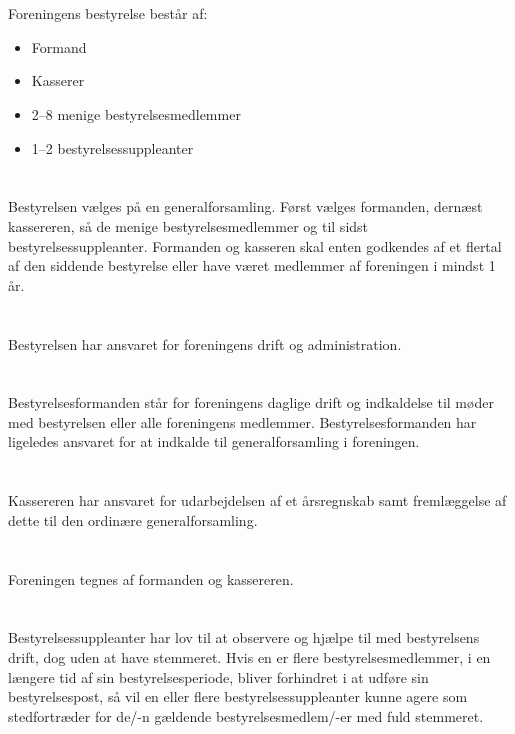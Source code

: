 \documentclass[danish,a4paper,twocolumn,oneside,article]{memoir}
\begin{document}
\section{} Foreningens bestyrelse består af:

\begin{itemize}
\item Formand
\item Kasserer
\item 2--8 menige bestyrelsesmedlemmer
\item 1--2 bestyrelsessuppleanter
\end{itemize}

\section{} Bestyrelsen vælges på en generalforsamling. Først vælges formanden, dernæst kassereren, så de menige
bestyrelsesmedlemmer og til sidst bestyrelsessuppleanter. Formanden og kasseren skal enten godkendes af et flertal
af den siddende bestyrelse eller have været medlemmer af foreningen i mindst 1 år.

\section{} Bestyrelsen har ansvaret for foreningens drift og administration.

\section{} Bestyrelsesformanden står for foreningens daglige drift og indkaldelse til møder med bestyrelsen
eller alle foreningens medlemmer. Bestyrelsesformanden har ligeledes ansvaret for at indkalde til
generalforsamling i foreningen.

\section{} Kassereren har ansvaret for udarbejdelsen af et årsregnskab samt fremlæggelse af dette til den
ordinære generalforsamling.

\section{} Foreningen tegnes af formanden og kassereren.

\section{} Bestyrelsessuppleanter har lov til at observere og hjælpe til med bestyrelsens drift, dog uden at have stemmeret.
Hvis en er flere bestyrelsesmedlemmer, i en længere tid af sin bestyrelsesperiode, bliver forhindret i at udføre sin bestyrelsespost,
så vil en eller flere bestyrelsessuppleanter kunne agere som stedfortræder for de/-n gældende bestyrelsesmedlem/-er med fuld stemmeret.
\end{document}
